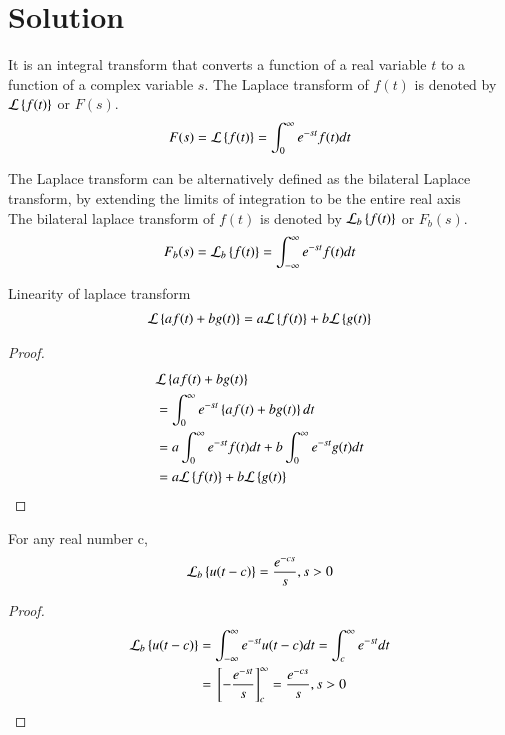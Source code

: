 \documentclass[journal,12pt,twocolumn]{IEEEtran}
\begin{document}
\section{Solution}
\begin{definition}
It is an integral transform that converts a function of a real variable $t$ to a function of a complex variable $s$. The Laplace transform of $f(t)$ is denoted by $\mathcal{L}\left\{f(t)\right\}$ or $F(s)$.
\begin{align}
    F(s)=\mathcal{L}\left\{f(t)\right\}=\int_{0}^{\infty}e^{-st}f(t)dt
\end{align}
\end{definition}
\begin{definition}
The Laplace transform can be alternatively defined as the bilateral Laplace transform, by extending the limits of integration to be the entire real axis\\
The bilateral laplace transform of $f(t)$ is denoted by $\mathcal{L}_b\left\{f(t)\right\}$ or $F_b(s)$.
\begin{align}
    F_b(s)=\mathcal{L}_b\left\{f(t)\right\}=\int_{-\infty}^{\infty}e^{-st}f(t)dt
\end{align}
\end{definition}
\begin{lemma}
Linearity of laplace transform
\begin{align} 
    \mathcal{L}\left\{af(t)+bg(t)\right\} = a\mathcal{L}\left\{f(t)\right\}+b\mathcal{L}\left\{g(t)\right\}\label{eq:linearity}
\end{align}
\begin{proof}
 \begin{align}
     &\mathcal{L}\left\{af(t)+bg(t)\right\} \\&= \int_{0}^{\infty}e^{-st}\left\{af(t)+bg(t)\right\}dt\\
     &= a\int_{0}^{\infty}e^{-st}f(t)dt+b\int_{0}^{\infty}e^{-st}g(t)dt\\
     &= a\mathcal{L}\left\{f(t)\right\}+b\mathcal{L}\left\{g(t)\right\}
 \end{align}
\end{proof}
\end{lemma}
\begin{lemma}
For any real number c, 
\begin{align}
    \mathcal{L}_b\left\{u(t-c)\right\}=\dfrac{e^{-cs}}{s}, s>0
    \label{eq:u}
\end{align}
\end{lemma}
\begin{proof}
 \begin{align}
     \mathcal{L}_b\left\{u(t-c)\right\}&=\int_{-\infty}^{\infty}e^{-st}u(t-c)dt=\int_{c}^{\infty}e^{-st}dt\\
     &={}\left[-\dfrac{e^{-st}}{s}\right]_{c}^{\infty}=\dfrac{e^{-cs}}{s}, s>0
 \end{align}
\end{proof}
\end{document}

